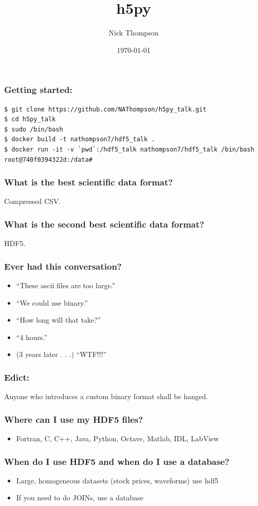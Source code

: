 \documentclass[9pt]{beamer}
\begin{document}
\title{h5py}
\author{Nick Thompson} 
\date{\today}

\frame{\titlepage}

\begin{frame}[fragile]
\frametitle{Getting started:}
\begin{verbatim}
$ git clone https://github.com/NAThompson/h5py_talk.git
$ cd h5py_talk
$ sudo /bin/bash
$ docker build -t nathompson7/hdf5_talk .  
$ docker run -it -v `pwd`:/hdf5_talk nathompson7/hdf5_talk /bin/bash
root@740f0394322d:/data#
\end{verbatim}
\end{frame}

\begin{frame}[fragile]
  \frametitle{What is the best scientific data format?}
  \pause
  Compressed CSV.
\end{frame}


\begin{frame}[fragile]
  \frametitle{What is the second best scientific data format?}
  HDF5.
\end{frame}

\begin{frame}[fragile]
  \frametitle{Ever had this conversation?}
  \begin{itemize}
  \item ``These ascii files are too large.''
  \item ``We could use binary.''
  \item ``How long will that take?''
  \item ``4 hours.''
  \item (3 years later . . .) ``WTF!!!''
  \end{itemize}
\end{frame}

\begin{frame}[fragile]
  \frametitle{Edict:}

  Anyone who introduces a custom binary format shall be hanged.
\end{frame}

\begin{frame}[fragile]
  \frametitle{Where can I use my HDF5 files?}
  \begin{itemize}
  \item Fortran, C, C++, Java, Python, Octave, Matlab, IDL, LabView
  \end{itemize}
\end{frame}

\begin{frame}[fragile]
  \frametitle{When do I use HDF5 and when do I use a database?}
  \begin{itemize}
  \item Large, homogeneous datasets (stock prices, waveforms) use hdf5
  \item If you need to do JOINs, use a database
  \end{itemize}
\end{frame}
\end{document}
